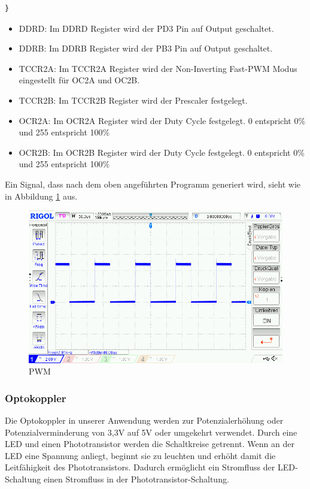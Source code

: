 \begin{itemize}
\begin{lstlisting}[caption=$\mu$C-Programm,style=C]
}
\end{lstlisting}
\newpage
\begin{itemize}
\item DDRD: Im DDRD Register wird der PD3 Pin auf Output geschaltet.
\item DDRB: Im DDRB Register wird der PB3 Pin auf Output geschaltet.
\item TCCR2A: Im TCCR2A Register wird der Non-Inverting Fast-PWM Modus eingestellt für OC2A und OC2B. 
\item TCCR2B: Im TCCR2B Register wird der Prescaler festgelegt. 
\item OCR2A: Im OCR2A Register wird der Duty Cycle festgelegt. 0 entspricht 0\% und 255 entspricht 100\% 
\item OCR2B: Im OCR2B Register wird der Duty Cycle festgelegt. 0 entspricht 0\% und 255 entspricht 100\% 
\end{itemize}
\end{itemize}

Ein Signal, dass nach dem oben angeführten Programm generiert wird, sieht wie in Abbildung \ref{PWM} aus.
\begin{figure}[H] 
\begin{center}

\includegraphics[width=13cm]{Bilder/PWM/pwm}
\caption{PWM}
\label{PWM}

\end{center}
\end{figure}
\newpage
\subsubsection{Optokoppler}

Die Optokoppler in unserer Anwendung werden zur Potenzialerhöhung oder Potenzialverminderung von 3,3V auf 5V oder umgekehrt verwendet. Durch eine LED und einen Phototransistor werden die Schaltkreise getrennt. Wenn an der LED eine Spannung anliegt, beginnt sie zu leuchten und erhöht damit die Leitfähigkeit des Phototransistors. Dadurch ermöglicht ein Stromfluss der LED-Schaltung einen Stromfluss in der Phototransistor-Schaltung.

